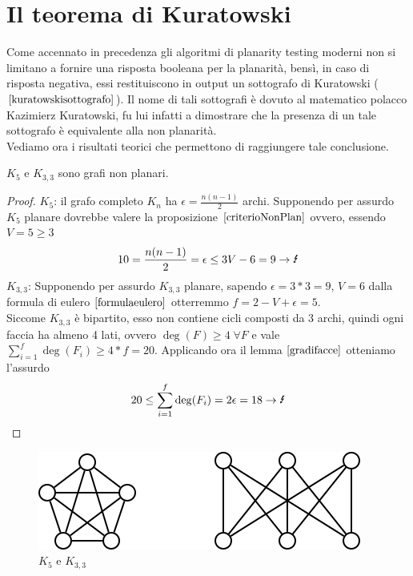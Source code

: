 \section{Il teorema di Kuratowski}
Come accennato in precedenza gli algoritmi di planarity testing moderni non si limitano a fornire una risposta booleana per la planarità, bensì, in caso di risposta negativa, essi restituiscono in output un sottografo di Kuratowski (\(\ref{kuratowskisottografo}\)). Il nome di tali sottografi è dovuto al matematico polacco Kazimierz Kuratowski, fu lui infatti a dimostrare che la presenza di un tale sottografo è equivalente alla non planarità.
\\ Vediamo ora i risultati teorici che permettono di raggiungere tale conclusione.
\begin{lemma}\label{k5k33nonplanari}
    \(K_5\) e \(K_{3,3}\) sono grafi non planari.
    \begin{proof}
        \underline{\(K_5\)}: il grafo completo \(K_n\) ha \(\epsilon=\frac{n(n-1)}{2}\) archi. Supponendo per assurdo \(K_5\) planare dovrebbe valere la proposizione \(\ref{criterioNonPlan}\) ovvero, essendo \(V=5 \geq 3\)
        \begin{equation}
            10 = \frac{n(n-1)}{2} = \epsilon \leq 3V-6 = 9 \rightarrow \text{\Lightning}
        \end{equation}
        \underline{\(K_{3,3}\)}: Supponendo per assurdo \(K_{3,3}\) planare, sapendo \(\epsilon=3*3=9\), \(V=6\) dalla formula di eulero \(\ref{formulaeulero}\) otterremmo \(f=2-V+\epsilon=5\). \\
        Siccome \(K_{3,3}\) è bipartito, esso non contiene cicli composti da 3 archi, quindi ogni faccia ha almeno 4 lati, ovvero \(\deg(F)\geq 4 \;\forall F\) e vale \(\sum_{i=1}^{f} \deg(F_i) \geq 4*f = 20\). Applicando ora il lemma \(\ref{gradifacce}\) otteniamo l'assurdo
        \begin{equation}
            20 \leq \sum_{i=1}^{f} \deg(F_i) = 2\epsilon = 18 \rightarrow\text{\Lightning}
        \end{equation} 
    \end{proof}
    \begin{figure}[H]
        \centering
        \includegraphics[scale=0.6]{img/k533.PNG}
        \caption{\(K_5\) e \(K_{3,3}\)}
    \end{figure} 
\end{lemma}
